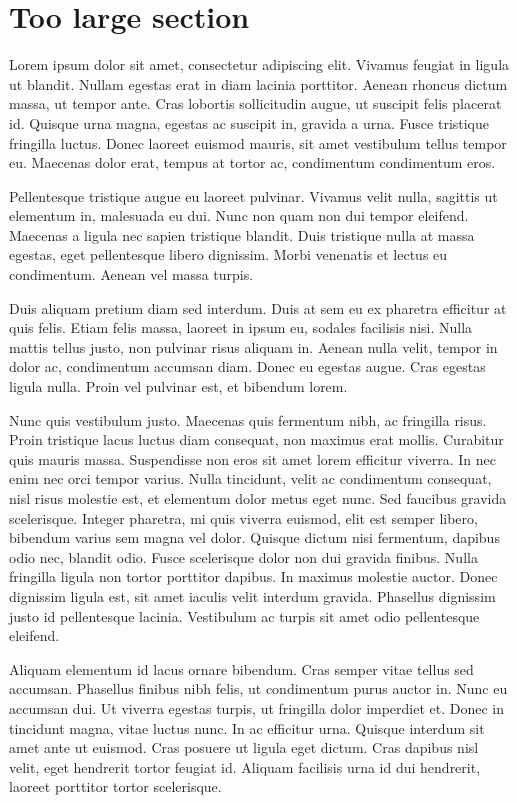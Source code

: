 \documentclass[11pt]{article}
\begin{document}
    \chapter{Too large section}
    Lorem ipsum dolor sit amet, consectetur adipiscing elit. Vivamus feugiat in ligula ut blandit. Nullam egestas erat in diam lacinia porttitor. Aenean rhoncus dictum massa, ut tempor ante. Cras lobortis sollicitudin augue, ut suscipit felis placerat id. Quisque urna magna, egestas ac suscipit in, gravida a urna. Fusce tristique fringilla luctus. Donec laoreet euismod mauris, sit amet vestibulum tellus tempor eu. Maecenas dolor erat, tempus at tortor ac, condimentum condimentum eros.

    Pellentesque tristique augue eu laoreet pulvinar. Vivamus velit nulla, sagittis ut elementum in, malesuada eu dui. Nunc non quam non dui tempor eleifend. Maecenas a ligula nec sapien tristique blandit. Duis tristique nulla at massa egestas, eget pellentesque libero dignissim. Morbi venenatis et lectus eu condimentum. Aenean vel massa turpis.

    Duis aliquam pretium diam sed interdum. Duis at sem eu ex pharetra efficitur at quis felis. Etiam felis massa, laoreet in ipsum eu, sodales facilisis nisi. Nulla mattis tellus justo, non pulvinar risus aliquam in. Aenean nulla velit, tempor in dolor ac, condimentum accumsan diam. Donec eu egestas augue. Cras egestas ligula nulla. Proin vel pulvinar est, et bibendum lorem.

    Nunc quis vestibulum justo. Maecenas quis fermentum nibh, ac fringilla risus. Proin tristique lacus luctus diam consequat, non maximus erat mollis. Curabitur quis mauris massa. Suspendisse non eros sit amet lorem efficitur viverra. In nec enim nec orci tempor varius. Nulla tincidunt, velit ac condimentum consequat, nisl risus molestie est, et elementum dolor metus eget nunc. Sed faucibus gravida scelerisque. Integer pharetra, mi quis viverra euismod, elit est semper libero, bibendum varius sem magna vel dolor. Quisque dictum nisi fermentum, dapibus odio nec, blandit odio. Fusce scelerisque dolor non dui gravida finibus. Nulla fringilla ligula non tortor porttitor dapibus. In maximus molestie auctor. Donec dignissim ligula est, sit amet iaculis velit interdum gravida. Phasellus dignissim justo id pellentesque lacinia. Vestibulum ac turpis sit amet odio pellentesque eleifend.

    Aliquam elementum id lacus ornare bibendum. Cras semper vitae tellus sed accumsan. Phasellus finibus nibh felis, ut condimentum purus auctor in. Nunc eu accumsan dui. Ut viverra egestas turpis, ut fringilla dolor imperdiet et. Donec in tincidunt magna, vitae luctus nunc. In ac efficitur urna. Quisque interdum sit amet ante ut euismod. Cras posuere ut ligula eget dictum. Cras dapibus nisl velit, eget hendrerit tortor feugiat id. Aliquam facilisis urna id dui hendrerit, laoreet porttitor tortor scelerisque.
\end{document}
